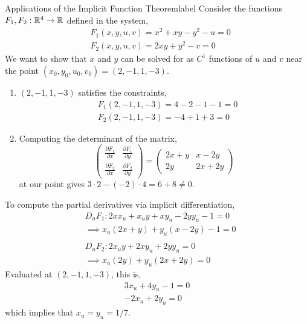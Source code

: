 \begin{ex}{Applications of the Implicit Function Theorem}{label}
	Consider the functions $F_1, F_2: \mathbb{R}^4 \rightarrow \mathbb{R}$ defined in the system,
	\begin{align*}
	&F_1(x, y, u, v)=x^2+x y-y^2-u = 0\\
	&F_2(x, y, u, v)=2 x y+y^2-v = 0
	\end{align*}
	We want to show that $x$ and $y$ can be solved for as $C^1$ functions of $u$ and $v$ near the point $(x_0, y_0, u_0, v_0) = (2, -1, 1, -3)$.
	\begin{enumerate}
		\item $(2, -1, 1, -3)$ satisfies the constraints,
		\begin{align*}
		&F_1(2,-1,1,-3)=4-2-1-1=0 \\
		&F_2(2,-1,1,-3)=-4+1+3=0
		\end{align*}
		\item Computing the determinant of the matrix,
		\[\left(\begin{array}{ll}
		\frac{\partial F_1}{\partial x} & \frac{\partial F_1}{\partial y} \\
		\frac{\partial F_2}{\partial x} & \frac{\partial F_2}{\partial y}
		\end{array}\right)=\left(\begin{array}{cc}
		2 x+y & x-2 y \\
		2 y & 2 x+2 y
		\end{array}\right)\]
		at our point gives $3 \cdot 2-(-2) \cdot 4=6+8 \neq 0$.
	\end{enumerate}
	To compute the partial derivatives via implicit differentiation,
	\begin{align*}
	&D_u F_1: 2 x x_u+x_u y+x y_u-2 y y_u-1=0 \\
	&\implies x_u(2 x+y)+y_u(x-2 y)-1=0 \\ \\
	&D_u F_2: 2 x_u y+2 x y_u+2 y y_u =0 \\
	&\implies x_u(2 y)+y_u(2 x+2 y) =0
	\end{align*}
	Evaluated at $(2, -1, 1, -3)$, this is,
	\begin{align*}
		3x_u + 4y_u - 1 = 0 \\
		-2x_u + 2y_u = 0
	\end{align*}
	which implies that $x_u = y_u = 1/7$.
\end{ex}

